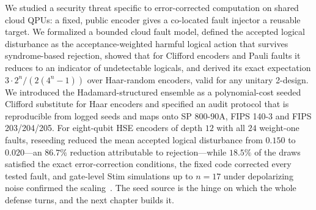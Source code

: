 We studied a security threat specific to error-corrected computation on shared cloud QPUs: a fixed, public encoder gives a co-located fault injector a reusable target. We formalized a bounded cloud fault model, defined the accepted logical disturbance as the acceptance-weighted harmful logical action that survives syndrome-based rejection, showed that for Clifford encoders and Pauli faults it reduces to an indicator of undetectable logicals, and derived its exact expectation $3\cdot 2^{n}/(2(4^{n}-1))$ over Haar-random encoders, valid for any unitary 2-design. We introduced the Hadamard-structured ensemble as a polynomial-cost seeded Clifford substitute for Haar encoders and specified an audit protocol that is reproducible from logged seeds and maps onto SP 800-90A, FIPS 140-3 and FIPS 203/204/205. For eight-qubit HSE encoders of depth $12$ with all $24$ weight-one faults, reseeding reduced the mean accepted logical disturbance from $0.150$ to $0.020$---an $86.7\%$ reduction attributable to rejection---while $18.5\%$ of the draws satisfied the exact error-correction conditions, the fixed  code corrected every tested fault, and gate-level Stim simulations up to $n=17$ under depolarizing noise confirmed the scaling~\cite{guo2026qecaudit}. The seed source is the hinge on which the whole defense turns, and the next chapter builds it.
